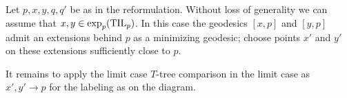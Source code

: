 Let $p,x,y, q, q'$ be as in the reformulation.
Without loss of generality we can assume that $x,y\in\exp_p(\mathrm{\rm TIL}_p)$.
In this case the geodesics $[x,p]$ and $[y,p]$ admit an extensions behind $p$ as a minimizing geodesic;
choose points $x'$ and $y'$ on these extensions sufficiently close to $p$.

It remains to apply the limit case $T$-tree comparison in the limit case as $x',y'\to p$ for the labeling as on the diagram.
\qeds


